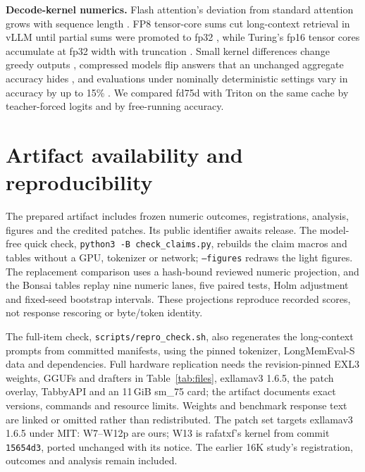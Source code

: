 \documentclass[11pt,letterpaper]{article}
\newcommand{\q}[1]{\texttt{#1}}
\begin{document}
\textbf{Decode-kernel numerics.} Flash attention's deviation from standard
attention grows with sequence length \citep{golden2024flash}. FP8 tensor-core
sums cut long-context retrieval in vLLM until partial sums were promoted to
fp32 \citep{kubler2026fp8}, while Turing's fp16 tensor cores accumulate at
fp32 width with truncation \citep{fasi2021tensorcores}. Small kernel
differences change greedy outputs
\citep{yuan2025nondeterminism,du2026greedy,chen2026integer,he2025nondeterminism},
compressed models flip answers that an unchanged aggregate accuracy hides
\citep{dutta2024accuracy}, and evaluations under nominally deterministic settings vary in accuracy by up
to 15\% \citep{atil2024nondeterminism}. We compared fd75d with Triton on the
same cache by teacher-forced logits and by free-running accuracy.



\section{Artifact availability and reproducibility}
\label{sec:artifacts}
The prepared artifact includes frozen numeric outcomes, registrations,
analysis, figures and the credited patches. Its public identifier awaits
release. The model-free quick check, \q{python3 -B check\_claims.py},
rebuilds the claim macros and tables without a GPU, tokenizer or network;
\q{--figures} redraws the light figures. The replacement comparison uses a
hash-bound reviewed numeric projection, and the Bonsai tables replay nine
numeric lanes, five paired tests, Holm adjustment and fixed-seed bootstrap
intervals. These projections reproduce recorded scores, not response
rescoring or byte/token identity.

The full-item check, \q{scripts/repro\_check.sh}, also regenerates the
long-context prompts from committed manifests, using the pinned tokenizer,
LongMemEval-S data and dependencies. Full hardware replication needs the
revision-pinned EXL3 weights, GGUFs and drafters in Table~\ref{tab:files},
exllamav3 1.6.5, the patch overlay, TabbyAPI and an 11\,GiB sm\_75 card;
the artifact documents exact versions, commands and resource limits.
Weights and benchmark response text are linked or omitted rather than
redistributed. The patch set targets exllamav3 1.6.5 under MIT: W7--W12p
are ours; W13 is rafatxf's kernel from commit \q{15654d3}, ported unchanged
with its notice. The earlier 16K study's registration, outcomes and analysis
remain included.
\end{document}
